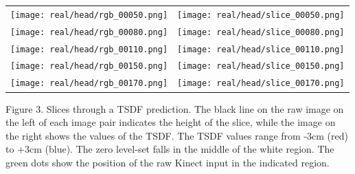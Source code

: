 \documentclass[10pt,onecolumn,letterpaper]{article}
\begin{document}
\centering
\vspace{10pt}
\begin{tabular}{cc}
\centering
\texttt{[image: real/head/rgb\_00050.png]} &
\texttt{[image: real/head/slice\_00050.png]} \\
\texttt{[image: real/head/rgb\_00080.png]} &
\texttt{[image: real/head/slice\_00080.png]} \\
\texttt{[image: real/head/rgb\_00110.png]} &
\texttt{[image: real/head/slice\_00110.png]} \\
\texttt{[image: real/head/rgb\_00150.png]} &
\texttt{[image: real/head/slice\_00150.png]} \\
\texttt{[image: real/head/rgb\_00170.png]} &
\texttt{[image: real/head/slice\_00170.png]} 
\end{tabular}
\vspace{10pt}

{\centering \small Figure 3. Slices through a TSDF prediction. The black line on the raw image on the left of each image pair indicates the height of the slice, while the image on the right shows the values of the TSDF.
The TSDF values range from -3cm (red) to +3cm (blue).
The zero level-set falls in the middle of the white region.
The green dots show the position of the raw Kinect input in the indicated region.
}
\vspace{10pt}
\end{document}
